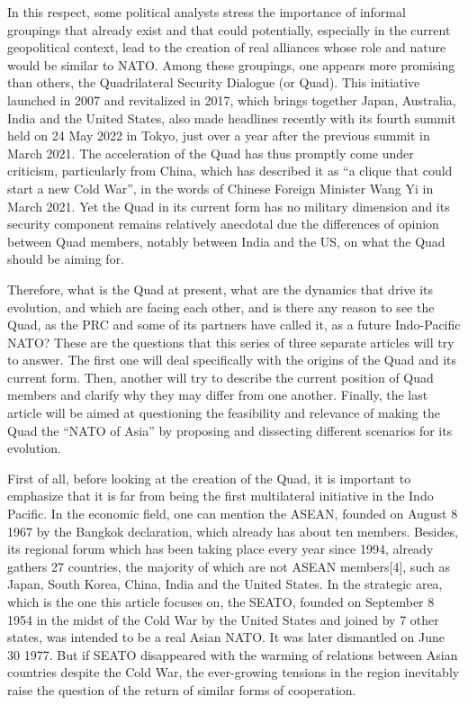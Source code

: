 \documentclass[11pt,a4paper]{article}
\begin{document}
In this respect, some political analysts stress the importance of informal groupings that already exist and that could potentially, especially in the current geopolitical context, lead to the creation of real alliances whose role and nature would be similar to NATO. Among these groupings, one appears more promising than others, the Quadrilateral Security Dialogue (or Quad). This initiative launched in 2007 and revitalized in 2017, which brings together Japan, Australia, India and the United States, also made headlines recently with its fourth summit held on 24 May 2022 in Tokyo, just over a year after the previous summit in March 2021. The acceleration of the Quad has thus promptly come under criticism, particularly from China, which has described it as “a clique that could start a new Cold War”, in the words of Chinese Foreign Minister Wang Yi in March 2021. Yet the Quad in its current form has no military dimension and its security component remains relatively anecdotal due the differences of opinion between Quad members, notably between India and the US, on what the Quad should be aiming for.

Therefore, what is the Quad at present, what are the dynamics that drive its evolution, and which are facing each other, and is there any reason to see the Quad, as the PRC and some of its partners have called it, as a future Indo-Pacific NATO? These are the questions that this series of three separate articles will try to answer. The first one will deal specifically with the origins of the Quad and its current form. Then, another will try to describe the current position of Quad members and clarify why they may differ from one another. Finally, the last article will be aimed at questioning the feasibility and relevance of making the Quad the “NATO of Asia” by proposing and dissecting different scenarios for its evolution.

First of all, before looking at the creation of the Quad, it is important to emphasize that it is far from being the first multilateral initiative in the Indo Pacific. In the economic field, one can mention the ASEAN, founded on August 8 1967 by the Bangkok declaration, which already has about ten members. Besides, its regional forum which has been taking place every year since 1994, already gathers 27 countries, the majority of which are not ASEAN members{[}4{]}, such as Japan, South Korea, China, India and the United States. In the strategic area, which is the one this article focuses on, the SEATO, founded on September 8 1954 in the midst of the Cold War by the United States and joined by 7 other states, was intended to be a real Asian NATO. It was later dismantled on June 30 1977. But if SEATO disappeared with the warming of relations between Asian countries despite the Cold War, the ever-growing tensions in the region inevitably raise the question of the return of similar forms of cooperation.
\end{document}
